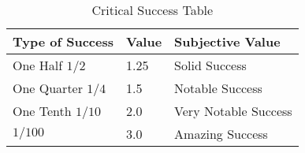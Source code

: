 \begin{table}[h]
	\begin{tabular}{l|l|l}
	Type of Success				& Value & Subjective Value	\\
	\hline
	One Half \( 1/2 \)			& 1.25	& Solid Success		\\
        One Quarter \( 1/4 \) 	& 1.5	& Notable Success	\\
        One Tenth \( 1/10 \) 	& 2.0	& Very Notable Success	\\
        \(1/100\) 				& 3.0	& Amazing Success	\\
	\end{tabular}
	\caption{Critical Success Table}\label{Table:CriticalSuccess}
\end{table}
